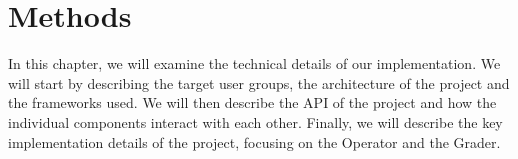\chapter{Methods}\label{ch:methods}

In this chapter, we will examine the technical details of our implementation. We will start by describing the target user groups, the architecture of the project and the frameworks used. We will then describe the API of the project and how the individual components interact with each other. Finally, we will describe the key implementation details of the project, focusing on the Operator and the Grader. \cite{imrad}

\lipsum[1-2]
